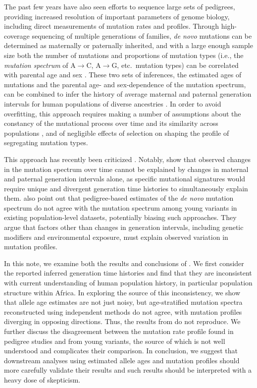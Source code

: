 \documentclass[]{article}
\begin{document}
The past few years have also seen efforts to sequence large sets of pedigrees,
providing increased resolution of important parameters of genome biology,
including direct measurements of mutation rates and profiles. Through
high-coverage sequencing of multiple generations of families, \emph{de novo}
mutations can be determined as maternally or paternally inherited, and with a
large enough sample size both the number of mutations and proportions of
mutation types (i.e., the \emph{mutation spectrum} of A$\rightarrow$C,
A$\rightarrow$G, etc.\ mutation types) can be correlated with parental age and
sex \citep{jonsson2017parental,halldorsson2019characterizing}.  These two sets
of inferences, the estimated ages of mutations and the parental age- and
sex-dependence of the mutation spectrum, can be combined to infer the history
of average maternal and paternal generation intervals for human populations of
diverse ancestries \citep{macia2021different,wang2023human}. In order to avoid
overfitting, this approach requires making a number of assumptions about the
constancy of the mutational process over time and its similarity across
populations \citep{harris2015evidence,mathieson2017differences,harris2017rapid,
dewitt2021nonparametric}, and of negligible effects of selection on shaping the
profile of segregating mutation types.

This approach has recently been criticized \citep{gao2022limited}. Notably,
\citet{gao2022limited} show that observed changes in the mutation spectrum over
time cannot be explained by changes in maternal and paternal generation
intervals alone, as specific mutational signatures would require unique and
divergent generation time histories to simultaneously explain them.
\citet{gao2022limited} also point out that pedigree-based estimates of the
\emph{de novo} mutation spectrum do not agree with the mutation spectrum among
young variants in existing population-level datasets, potentially biasing such
approaches. They argue that factors other than changes in generation intervals,
including genetic modifiers and environmental exposure, must explain observed
variation in mutation profiles.

In this note, we examine both the results and conclusions of
\citet{wang2023human}. We first consider the reported inferred generation time
histories and find that they are inconsistent with current understanding of
human population history, in particular population structure within Africa. In
exploring the source of this inconsistency, we show that allele age estimates
are not just noisy, but age-stratified mutation spectra reconstructed using
independent methods do not agree, with mutation profiles diverging in opposing
directions. Thus, the results from \citet{wang2023human} do not reproduce. We
further discuss the disagreement between the mutation rate profile found in
pedigree studies and from young variants, the source of which is not well
understood and complicates their comparison. In conclusion, we suggest that
downstream analyses using estimated allele ages and mutation profiles should
more carefully validate their results and such results should be interpreted
with a heavy dose of skepticism.
\end{document}
